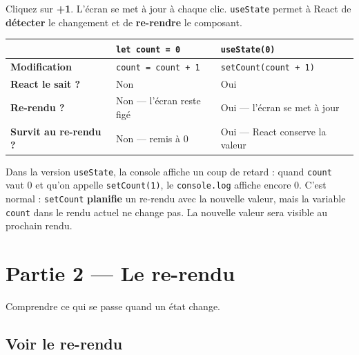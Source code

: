 \documentclass[11pt,a4paper]{article}
\begin{document}
Cliquez sur \textbf{+1}. L'écran se met à jour à chaque clic. \texttt{useState} permet à React de \textbf{détecter} le changement et de \textbf{re-rendre} le composant.

\begin{retenirbox}
\begin{center}
\begin{tabular}{lp{5cm}p{5cm}}
\toprule
& \textbf{\texttt{let count = 0}} & \textbf{\texttt{useState(0)}} \\
\midrule
\textbf{Modification} & \texttt{count = count + 1} & \texttt{setCount(count + 1)} \\
\textbf{React le sait ?} & Non & Oui \\
\textbf{Re-rendu ?} & Non --- l'écran reste figé & Oui --- l'écran se met à jour \\
\textbf{Survit au re-rendu ?} & Non --- remis à 0 & Oui --- React conserve la valeur \\
\bottomrule
\end{tabular}
\end{center}
\end{retenirbox}

\begin{attentionbox}
Dans la version \texttt{useState}, la console affiche un coup de retard : quand \texttt{count} vaut 0 et qu'on appelle \texttt{setCount(1)}, le \texttt{console.log} affiche encore 0. C'est normal : \texttt{setCount} \textbf{planifie} un re-rendu avec la nouvelle valeur, mais la variable \texttt{count} dans le rendu actuel ne change pas. La nouvelle valeur sera visible au prochain rendu.
\end{attentionbox}

\section{Partie 2 --- Le re-rendu}
\label{sec:rerendu}

\begin{objectifbox}
Comprendre ce qui se passe quand un état change.
\end{objectifbox}

\subsection{Voir le re-rendu}
\end{document}
